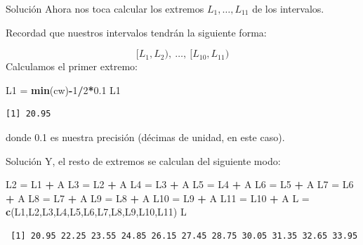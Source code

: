 \documentclass[
  ignorenonframetext,
  aspectratio=169]{beamer}
\newenvironment{Shaded}{\begin{snugshade}}{\end{snugshade}}
\newcommand{\DecValTok}[1]{\textcolor[rgb]{0.00,0.00,0.81}{#1}}
\newcommand{\FloatTok}[1]{\textcolor[rgb]{0.00,0.00,0.81}{#1}}
\newcommand{\FunctionTok}[1]{\textcolor[rgb]{0.13,0.29,0.53}{\textbf{#1}}}
\newcommand{\NormalTok}[1]{#1}
\newcommand{\OtherTok}[1]{\textcolor[rgb]{0.56,0.35,0.01}{#1}}
\newcommand{\SpecialCharTok}[1]{\textcolor[rgb]{0.81,0.36,0.00}{\textbf{#1}}}
\begin{document}
\begin{frame}[fragile]{Solución}
\label{soluciuxf3n-5}
Ahora nos toca calcular los extremos \(L_1,\dots,L_{11}\) de los
intervalos.

Recordad que nuestros intervalos tendrán la siguiente forma:

\[[L_1,L_2),\ \dots,\ [L_{10},L_{11})\] Calculamos el primer extremo:

\begin{Shaded}
\begin{Highlighting}[]
\NormalTok{L1 }\OtherTok{=} \FunctionTok{min}\NormalTok{(cw)}\SpecialCharTok{{-}}\DecValTok{1}\SpecialCharTok{/}\DecValTok{2}\SpecialCharTok{*}\FloatTok{0.1}
\NormalTok{L1}
\end{Highlighting}
\end{Shaded}

\begin{verbatim}
[1] 20.95
\end{verbatim}

donde 0.1 es nuestra precisión (décimas de unidad, en este caso).
\end{frame}

\begin{frame}[fragile]{Solución}
\label{soluciuxf3n-6}
Y, el resto de extremos se calculan del siguiente modo:

\begin{Shaded}
\begin{Highlighting}[]
\NormalTok{L2 }\OtherTok{=}\NormalTok{ L1 }\SpecialCharTok{+}\NormalTok{ A}
\NormalTok{L3 }\OtherTok{=}\NormalTok{ L2 }\SpecialCharTok{+}\NormalTok{ A}
\NormalTok{L4 }\OtherTok{=}\NormalTok{ L3 }\SpecialCharTok{+}\NormalTok{ A}
\NormalTok{L5 }\OtherTok{=}\NormalTok{ L4 }\SpecialCharTok{+}\NormalTok{ A}
\NormalTok{L6 }\OtherTok{=}\NormalTok{ L5 }\SpecialCharTok{+}\NormalTok{ A}
\NormalTok{L7 }\OtherTok{=}\NormalTok{ L6 }\SpecialCharTok{+}\NormalTok{ A}
\NormalTok{L8 }\OtherTok{=}\NormalTok{ L7 }\SpecialCharTok{+}\NormalTok{ A}
\NormalTok{L9 }\OtherTok{=}\NormalTok{ L8 }\SpecialCharTok{+}\NormalTok{ A}
\NormalTok{L10 }\OtherTok{=}\NormalTok{ L9 }\SpecialCharTok{+}\NormalTok{ A}
\NormalTok{L11 }\OtherTok{=}\NormalTok{ L10 }\SpecialCharTok{+}\NormalTok{ A}
\NormalTok{L }\OtherTok{=} \FunctionTok{c}\NormalTok{(L1,L2,L3,L4,L5,L6,L7,L8,L9,L10,L11)}
\NormalTok{L}
\end{Highlighting}
\end{Shaded}

\begin{verbatim}
 [1] 20.95 22.25 23.55 24.85 26.15 27.45 28.75 30.05 31.35 32.65 33.95
\end{verbatim}
\end{frame}
\end{document}
